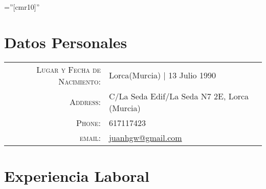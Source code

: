 \documentclass[a4paper,10pt]{article} %
\begin{document}
\pagestyle{empty} %

\font\fb=''[cmr10]'' %


\par{\bigskip\par} %

\section{Datos Personales}

\begin{tabular}{rl}
\textsc{Lugar y Fecha de Nacimiento:} & Lorca(Murcia)  | 13 Julio 1990 \\
\textsc{Address:} & C/La Seda Edif/La Seda N7 2E, Lorca (Murcia) \\
\textsc{Phone:} & 617117423\\
\textsc{email:} & \href{mailto:juanhgw@gmail.com}{juanhgw@gmail.com}
\end{tabular}


\section{Experiencia Laboral}
\end{document}
